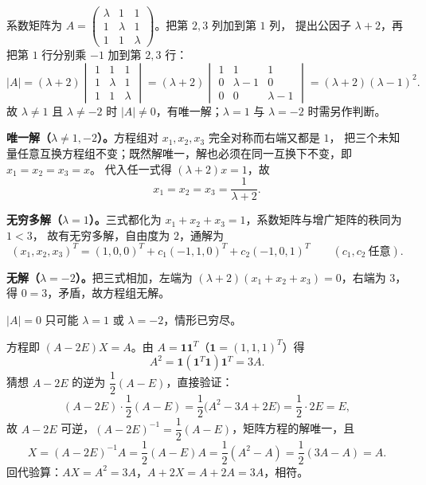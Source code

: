 \begin{solution}
系数矩阵为 $A=\begin{pmatrix}\lambda&1&1\\1&\lambda&1\\1&1&\lambda\end{pmatrix}$。把第 $2,3$ 列加到第 $1$ 列，
提出公因子 $\lambda+2$，再把第 $1$ 行分别乘 $-1$ 加到第 $2,3$ 行：
\[
|A|=(\lambda+2)\begin{vmatrix}1&1&1\\1&\lambda&1\\1&1&\lambda\end{vmatrix}
=(\lambda+2)\begin{vmatrix}1&1&1\\0&\lambda-1&0\\0&0&\lambda-1\end{vmatrix}
=(\lambda+2)(\lambda-1)^{2}.
\]
故 $\lambda\ne1$ 且 $\lambda\ne-2$ 时 $|A|\ne0$，有唯一解；$\lambda=1$ 与 $\lambda=-2$ 时需另作判断。

\textbf{唯一解（$\lambda\ne1,-2$）。}方程组对 $x_{1},x_{2},x_{3}$ 完全对称而右端又都是 $1$，
把三个未知量任意互换方程组不变；既然解唯一，解也必须在同一互换下不变，即 $x_{1}=x_{2}=x_{3}=x$。
代入任一式得 $(\lambda+2)x=1$，故
\[
x_{1}=x_{2}=x_{3}=\frac{1}{\lambda+2}.
\]

\textbf{无穷多解（$\lambda=1$）。}三式都化为 $x_{1}+x_{2}+x_{3}=1$，系数矩阵与增广矩阵的秩同为 $1<3$，
故有无穷多解，自由度为 $2$，通解为
\[
(x_{1},x_{2},x_{3})^{T}=(1,0,0)^{T}+c_{1}(-1,1,0)^{T}+c_{2}(-1,0,1)^{T}\qquad(c_{1},c_{2}\ \text{任意}).
\]

\textbf{无解（$\lambda=-2$）。}把三式相加，左端为 $(\lambda+2)(x_{1}+x_{2}+x_{3})=0$，右端为 $3$，
得 $0=3$，矛盾，故方程组无解。

$|A|=0$ 只可能 $\lambda=1$ 或 $\lambda=-2$，情形已穷尽。
\end{solution}

\begin{solution}
方程即 $(A-2E)X=A$。由 $A=\mathbf{1}\mathbf{1}^{T}$（$\mathbf{1}=(1,1,1)^{T}$）得
\[
A^{2}=\mathbf{1}(\mathbf{1}^{T}\mathbf{1})\mathbf{1}^{T}=3A .
\]
猜想 $A-2E$ 的逆为 $\dfrac12(A-E)$，直接验证：
\[
(A-2E)\cdot\frac12(A-E)=\frac12\bigl(A^{2}-3A+2E\bigr)=\frac12\cdot 2E=E,
\]
故 $A-2E$ 可逆，$(A-2E)^{-1}=\dfrac12(A-E)$，矩阵方程的解唯一，且
\[
X=(A-2E)^{-1}A=\frac12(A-E)A=\frac12(A^{2}-A)=\frac12(3A-A)=A .
\]
回代验算：$AX=A^{2}=3A$，$A+2X=A+2A=3A$，相符。
\end{solution}

